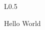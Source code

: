 \documentclass[a4paper]{article}
\begin{document}
\lipsum[1]


\lipsum[2]


\begin{wrapfigure}[5]{L}{0.5\textwidth}
\begin{tcolorbox}[title={Bye},]
    Hello World
\end{tcolorbox}
\end{wrapfigure}

\lipsum[3]
\end{document}
